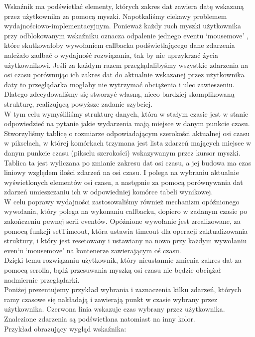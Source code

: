 \documentclass[polish,12pt]{aghthesis}
\begin{document}
Wskaźnik ma podświetlać elementy, których zakres dat zawiera datę wskazaną przez użytkownika za pomocą myszki. Napotkaliśmy ciekawy problemem wydajnościowo-implementacyjnym. Ponieważ każdy ruch myszki użytkownika przy odblokowanym wskaźniku oznacza odpalenie jednego eventu ‘mousemove’ , które skutkowałoby wywołaniem callbacka podświetlającego dane zdarzenia należało zadbać              o wydajność rozwiązania, tak by nie uprzykrzać życia użytkownikowi. Jeśli za każdym razem przeglądalibyśmy wszystkie zdarzenia na osi czasu porównując ich zakres dat do aktualnie wskazanej przez użytkownika daty to przeglądarka mogłaby nie wytrzymać obciążenia i ulec zawieszeniu. Dlatego zdecydowaliśmy się stworzyć własną, nieco bardziej skomplikowaną strukturę, realizującą powyższe zadanie szybciej. \\

W tym celu wymyśliliśmy strukturę danych, która w stałym czasie jest w stanie odpowiedzieć na pytanie jakie wydarzenia mają miejsce w danym punkcie czasu. 
Stworzyliśmy tablicę o rozmiarze odpowiadającym szerokości aktualnej osi czasu w pikselach, w której komórkach trzymana jest lista zdarzeń mających miejsce w danym punkcie czasu (pikselu szerokości) wskazywanym przez kursor myszki. 
Tablica ta jest wyliczana po zmianie zakresu dat osi czasu, a jej budowa ma czas liniowy względem ilości zdarzeń na osi czasu. I polega na wybraniu aktualnie wyświetlonych elementów osi czasu, a następnie za pomocą porównywania dat zdarzeń umieszczaniu ich w odpowiedniej komórce tabeli wynikowej.\\

W celu poprawy wydajności zastosowaliśmy również mechanizm opóźnionego wywołania, który polega na wykonaniu callbacku, dopiero w zadanym czasie po zakończeniu pewnej serii eventów. Opóźnione wywołanie jest zrealizowane, za pomocą funkcji setTimeout, która ustawia timeout dla operacji zaktualizowania struktury, i który jest resetowany i ustawiany na nowo przy każdym wywołaniu even`u ‘mousemove’ na kontenerze zawierającym oś czasu. \\

 Dzięki temu rozwiązaniu użytkownik, który nieustannie zmienia zakres dat za pomocą scrolla, bądź przesuwania myszką osi czasu nie będzie obciążał nadmiernie przeglądarki.\\ 	

Poniżej prezentujemy przykład wybrania i zaznaczenia kilku zdarzeń, których ramy czasowe się nakładają i zawierają punkt w czasie wybrany przez użytkownika. Czerwona linia wskazuje czas wybrany przez użytkownika. Znalezione zdarzenia są podświetlana natomiast na inny kolor.\\
\clearpage
Przykład obrazujący wygląd wskaźnika:\\
\end{document}
